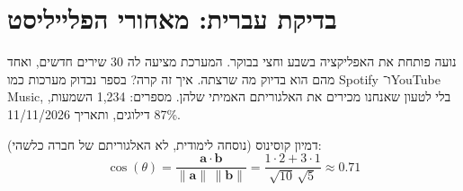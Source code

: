\documentclass[11pt,a4paper]{article}
\begin{document}
\section{בדיקת עברית: מאחורי הפלייליסט}

נועה פותחת את האפליקציה בשבע וחצי בבוקר. המערכת מציעה לה 30 שירים חדשים,
ואחד מהם הוא בדיוק מה שרצתה. איך זה קרה? בספר נבדוק מערכות כמו
\textenglish{Spotify} ו־\textenglish{YouTube Music}, בלי לטעון שאנחנו מכירים את האלגוריתם האמיתי שלהן.
מספרים: 1,234 השמעות, 87\% דילוגים, ותאריך 11/11/2026.

\begin{tcolorbox}[colback=brand!8,colframe=brand,title=בקצרה]
דמיון קוסינוס (נוסחה לימודית, לא האלגוריתם של חברה כלשהי):
\[
\cos(\theta)=\frac{\mathbf{a}\cdot\mathbf{b}}{\lVert\mathbf{a}\rVert\,\lVert\mathbf{b}\rVert}
=\frac{1\cdot 2+3\cdot 1}{\sqrt{10}\,\sqrt{5}}\approx 0.71
\]
\end{tcolorbox}

\begin{center}
\end{center}
\end{document}
